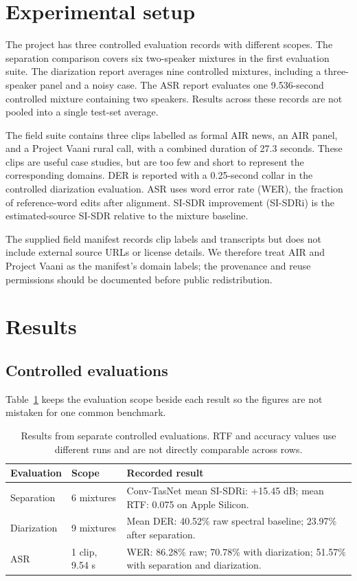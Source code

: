 \documentclass[11pt,a4paper,twocolumn]{article}
\begin{document}
\section{Experimental setup}
The project has three controlled evaluation records with different scopes. The separation comparison covers six two-speaker mixtures in the first evaluation suite. The diarization report averages nine controlled mixtures, including a three-speaker panel and a noisy case. The ASR report evaluates one 9.536-second controlled mixture containing two speakers. Results across these records are not pooled into a single test-set average.

The field suite contains three clips labelled as formal AIR news, an AIR panel, and a Project Vaani rural call, with a combined duration of 27.3 seconds. These clips are useful case studies, but are too few and short to represent the corresponding domains. DER is reported with a 0.25-second collar in the controlled diarization evaluation. ASR uses word error rate (WER), the fraction of reference-word edits after alignment. SI-SDR improvement (SI-SDRi) is the estimated-source SI-SDR relative to the mixture baseline.

The supplied field manifest records clip labels and transcripts but does not include external source URLs or license details. We therefore treat AIR and Project Vaani as the manifest's domain labels; the provenance and reuse permissions should be documented before public redistribution.

\section{Results}
\subsection{Controlled evaluations}
Table~\ref{tab:results} keeps the evaluation scope beside each result so the figures are not mistaken for one common benchmark.

\begin{table}[h]
\centering
\begin{tabularx}{\linewidth}{@{}l l X@{}}
\toprule
Evaluation & Scope & Recorded result \\
\midrule
Separation & 6 mixtures & Conv-TasNet mean SI-SDRi: +15.45 dB; mean RTF: 0.075 on Apple Silicon. \\
Diarization & 9 mixtures & Mean DER: 40.52\% raw spectral baseline; 23.97\% after separation. \\
ASR & 1 clip, 9.54 s & WER: 86.28\% raw; 70.78\% with diarization; 51.57\% with separation and diarization. \\
\bottomrule
\end{tabularx}
\caption{Results from separate controlled evaluations. RTF and accuracy values use different runs and are not directly comparable across rows.}
\label{tab:results}
\end{table}
\end{document}
